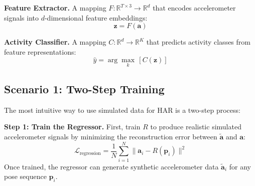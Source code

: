 \textbf{Feature Extractor.} A mapping $F: \mathbb{R}^{T \times 3} \rightarrow \mathbb{R}^{d}$ that encodes accelerometer signals into $d$-dimensional feature embeddings:
\begin{equation}
    \mathbf{z} = F(\mathbf{a})
\end{equation}

\textbf{Activity Classifier.} A mapping $C: \mathbb{R}^{d} \rightarrow \mathbb{R}^{K}$ that predicts activity classes from feature representations:
\begin{equation}
    \hat{y} = \arg\max_k \, [C(\mathbf{z})]
    \label{eq:C}
\end{equation}

\subsection{Scenario 1: Two-Step Training}
\label{sec:two-step}

The most intuitive way to use simulated data for HAR is a two-step process:

\textbf{Step 1: Train the Regressor.} First, train $R$ to produce realistic simulated accelerometer signals by minimizing the reconstruction error between $\tilde{\mathbf{a}}$ and $\mathbf{a}$:
\begin{equation}
    \mathcal{L}_{\text{regression}} = \frac{1}{N} \sum_{i=1}^{N} \lVert \mathbf{a}_i - R(\mathbf{p}_i) \rVert^{2}
\end{equation}
Once trained, the regressor can generate synthetic accelerometer data $\tilde{\mathbf{a}}_i$ for any pose sequence $\mathbf{p}_i$.

